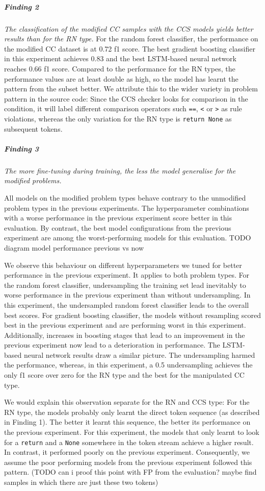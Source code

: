 \subparagraph{Finding 2}\label{finding:ccs_more_variety}
\textit{The classification of the modified CC samples with the CCS models yields better results than for the RN type.}
For the random forest classifier, the performance on the modified CC dataset is at 0.72 f1 score. The best gradient boosting classifier in this experiment achieves 0.83 and the best LSTM-based neural network reaches 0.66 f1 score. 
Compared to the performance for the RN types, the performance values are at least double as high, so the model has learnt the pattern from the subset better. We attribute this to the wider variety in problem pattern in the source code: Since the CCS checker looks for comparison in the condition, it will label different comparison operators such \texttt{==}, \texttt{<} or \texttt{>} as rule violations, whereas the only variation for the RN type is \texttt{return None} as subsequent tokens.

\subparagraph{Finding 3}\label{finding:better_vs_worse}
\textit{The more fine-tuning during training, the less the model generalise for the modified problems.}

All models on the modified problem types behave contrary to the unmodified problem types in the previous experiments. The hyperparameter combinations with a worse performance in the previous experiment score better in this evaluation. By contrast, the best model configurations from the previous experiment are among the worst-performing models for this evaluation.  
TODO diagram model performance previous vs now

We observe this behaviour on different hyperparameters we tuned for better performance in the previous experiment. It applies to both problem types.
For the random forest classifier, undersampling the training set lead inevitably to worse performance in the previous experiment than without undersampling. In this experiment, the undersampled random forest classifier leads to the overall best scores. For gradient boosting classifier, the models without resampling scored best in the previous experiment and are performing worst in this experiment. Additionally, increases in boosting stages that lead to an improvement in the previous experiment now lead to a deterioration in performance. 
The LSTM-based neural network results draw a similar picture. The undersampling harmed the performance, whereas, in this experiment, a 0.5 undersampling achieves the only f1 score over zero for the RN type and the best for the manipulated CC type.

We would explain this observation separate for the RN and CCS type:
For the RN type, the models probably only learnt the direct token sequence (as described in Finding 1). The better it learnt this sequence, the better its performance on the previous experiment. For this experiment, the models that only learnt to look for a \texttt{return} and a \texttt{None} somewhere in the token stream achieve a higher result. In contrast, it performed poorly on the previous experiment. Consequently,  we assume the poor performing models from the previous experiment followed this pattern. (TODO can i proof this point with FP from the evaluation? maybe find samples in which there are just these two tokens)

